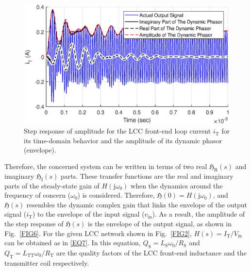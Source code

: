 \documentclass[journal,a4paper,10pt,twoside]{IEEEtran} %
\begin{document}
	 	\begin{figure}[t]
	    \begin{center}
	                \includegraphics[clip, trim=0.5cm 0cm 0.5cm 0cm, width=1\columnwidth]{FIGS/FIG10.eps}
	    \end{center}
	    \vspace{-3mm}
	    \caption{Step response of amplitude for the LCC front-end loop current $i_{\mathrm{T}}$ for its time-domain behavior and the amplitude of its dynamic phasor (envelope).}
	    \label{FIG10}
	    \vspace{-3mm}
	\end{figure}


	 Therefore, the concerned system can be written in terms of two real $\mathfrak{H}_\mathrm{R}(s)$ and imaginary $\mathfrak{H}_\mathrm{I}(s)$ parts. These transfer functions are the real and imaginary parts of the steady-state gain of $\mathit{H}(\mathrm{j}\omega_0)$ when the dynamics around the frequency of concern ($\omega_0$) is considered. Therefore, $\mathfrak{H}(0)=\mathit{H}(\mathrm{j}\omega_0)$, and $\mathfrak{H}(s)$ resembles the dynamic complex gain that links the envelope of the output signal ($i_\mathrm{T}$) to the envelope of the input signal ($v_\mathrm{in}$). As a result, the amplitude of the step response of $\mathfrak{H}(s)$ is the envelope of the output signal, as shown in Fig.~\ref{FIG6}. For the given LCC network shown in Fig.~\ref{FIG2}, $\mathit{H}(s)={I}_{\mathrm{T}}/{V}_{\mathrm{in}}$ can be obtained as in \eqref{EQ7}. In this equation, $Q_\mathrm{S}={L_{\mathrm{S}}\omega_0}/{R_{\mathrm{S}}}$ and $Q_\mathrm{T}={L_{\mathrm{TT}}\omega_0}/{R_{\mathrm{T}}}$ are the quality factors of the LCC front-end inductance and the transmitter coil respectively.
	 
\end{document}
